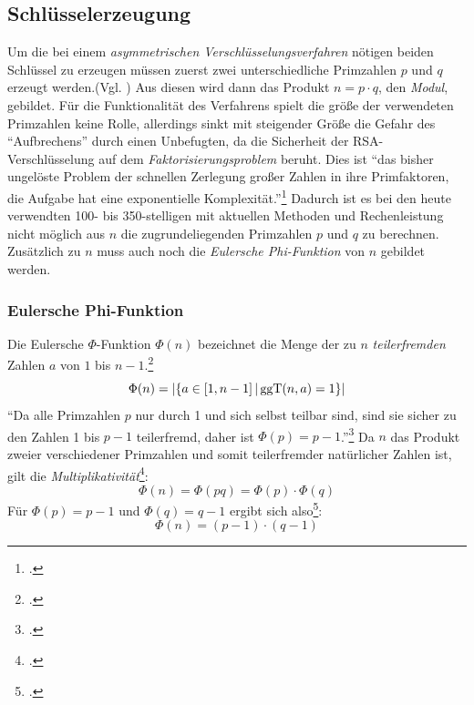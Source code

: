 \documentclass{scrarticle} %
\begin{document}
    \subsection{Schlüsselerzeugung}
        Um die bei einem \emph{asymmetrischen Verschlüsselungsverfahren} nötigen beiden Schlüssel zu erzeugen müssen zuerst zwei unterschiedliche Primzahlen $p$ und $q$ erzeugt werden.(Vgl. \cite[278]{dankmeier2006}) Aus diesen wird dann das Produkt $n=p\cdot q$, den \emph{Modul}, gebildet. Für die Funktionalität des Verfahrens spielt die größe der verwendeten Primzahlen keine Rolle, allerdings sinkt mit steigender Größe die Gefahr des \enquote{Aufbrechens} durch einen Unbefugten, da die Sicherheit der RSA-Verschlüsselung auf dem \emph{Faktorisierungsproblem} beruht. Dies ist \enquote{das bisher ungelöste Problem der schnellen Zerlegung großer Zahlen in ihre Primfaktoren, die Aufgabe hat eine exponentielle Komplexität.}\footcite[279]{dankmeier2006} Dadurch ist es bei den heute verwendten 100- bis 350-stelligen mit aktuellen Methoden und Rechenleistung nicht möglich aus $n$ die zugrundeliegenden Primzahlen $p$ und $q$ zu berechnen. %
        Zusätzlich zu $n$ muss auch noch die \emph{Eulersche Phi-Funktion} von $n$ gebildet werden.
        \subsubsection{Eulersche Phi-Funktion}
            Die Eulersche $\Phi$-Funktion $\Phi(n)$ bezeichnet die Menge der zu $n$ \emph{teilerfremden} Zahlen $a$ von $1$ bis $n-1$.\footcite[Vgl.][111]{swoboda2008kryptographie}
            \begin{equation}
                \Phi(n)= |\{a\in \left[ 1, n-1 \right] | \operatorname{ggT}(n, a)=1\}|
            \end{equation}
            \enquote{Da alle Primzahlen $p$ nur durch 1 und sich selbst teilbar sind, sind sie sicher zu den Zahlen 1 bis $p-1$ teilerfremd, daher ist $\Phi(p) = p-1$.}\footcite{steinfeld}
            Da $n$ das Produkt zweier verschiedener Primzahlen und somit teilerfremder natürlicher Zahlen ist, gilt die \emph{Multiplikativität}\footcite[Vgl.][]{steinfeld}:
            \begin{equation}
                \Phi(n) = \Phi(pq) = \Phi(p)\cdot\Phi(q)
            \end{equation}
            Für $\Phi(p) = p-1$ und $\Phi(q) = q-1$ ergibt sich also\footcite[Vgl.][279]{dankmeier2006}:
            \begin{equation}
                \Phi(n) = (p-1)\cdot(q-1)
            \end{equation}
\end{document}
